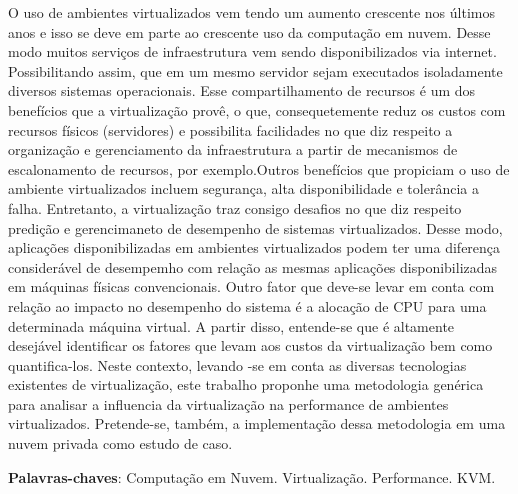 \begin{resumo}
 O uso de ambientes virtualizados vem tendo um aumento crescente nos últimos anos e isso
se deve em parte ao crescente uso da computação em nuvem. Desse modo muitos serviços de infraestrutura vem sendo disponibilizados via internet. Possibilitando assim, que em um mesmo servidor sejam executados isoladamente diversos sistemas operacionais. Esse compartilhamento de recursos é um dos benefícios que a virtualização provê, o que, consequetemente reduz os custos com recursos físicos (servidores) e possibilita facilidades no que diz respeito a organização e gerenciamento da infraestrutura a partir de mecanismos de escalonamento de recursos, por exemplo.Outros benefícios que propiciam o uso de ambiente virtualizados incluem segurança, alta disponibilidade e tolerância a falha. Entretanto, a virtualização traz consigo desafios no que diz respeito predição e gerencimaneto de desempenho de sistemas virtualizados. Desse modo, aplicações disponibilizadas em ambientes virtualizados podem ter uma diferença considerável de desempemho com relação as mesmas aplicações disponibilizadas em máquinas físicas convencionais. Outro fator que deve-se levar em conta com relação ao impacto no desempenho do sistema é a alocação de CPU para uma determinada máquina virtual. A partir disso, entende-se que é altamente desejável identificar os fatores que levam aos custos da virtualização bem como quantifica-los. Neste contexto, levando -se em conta as diversas tecnologias existentes de virtualização, este trabalho proponhe uma metodologia genérica para analisar a influencia da virtualização na performance de ambientes virtualizados. Pretende-se, também, a implementação dessa metodologia em uma nuvem privada como estudo de caso.

 \vspace{\onelineskip}
    
 \noindent
 \textbf{Palavras-chaves}: Computação em Nuvem. Virtualização. Performance. KVM.
\end{resumo}
